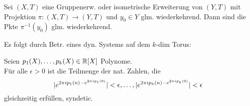\documentclass{cheat-sheet}
\begin{document}
\begin{thm}
  Sei $(X, T)$ eine Gruppenerw. oder isometrische Erweiterung von $(Y, T)$ mit Projektion $\pi : (X, T) \to (Y, T)$ und $y_0 \in Y$ glm. wiederkehrend.
  Dann sind die Pkte $\pi^{-1}(y_0)$ glm. wiederkehrend.
\end{thm}

\begin{bem}
  Es folgt durch Betr. eines dyn. Systems auf dem $k$-dim Torus:
\end{bem}

\begin{thm}
  Seien $p_1(X), \ldots, p_k(X) \in \mathbb{R}[X]$ Polynome. \\
  Für alle $\epsilon > 0$ ist die Teilmenge der nat. Zahlen, die
  \[
    \lvert e^{2 \pi i p_1(n) - e^{2 \pi i p_1(0)}}\rvert < \epsilon, \ldots,
    \lvert e^{2 \pi i p_k(n) - e^{2 \pi i p_k(0)}}\rvert < \epsilon
  \]
  gleichzeitig erfüllen, syndetic.
\end{thm}


\end{document}
